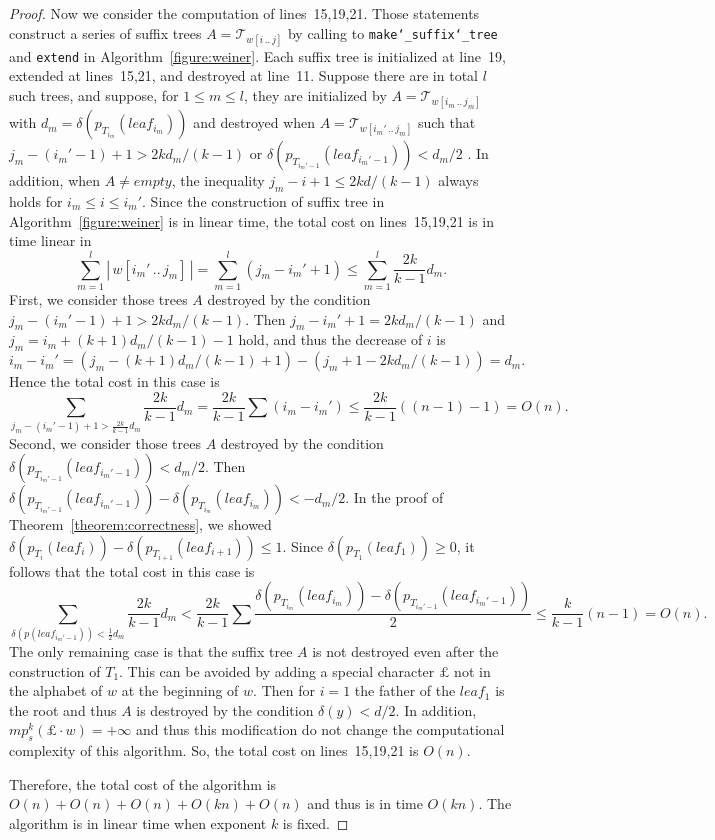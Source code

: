 \documentclass{article}
\def\us{\char`\_}
\def\subw#1#2#3{{#1[#2\,..\,#3]}}
\def\abs#1{{|\,#1\,|}}
\def\tree{\mathcal{T}}
\begin{document}
\begin{proof}
Now we consider the computation of lines~15,19,21. Those statements
construct a series of suffix trees $A=\tree_{\subw{w}{i}{j}}$ by
calling to {\tt make\us suffix\us tree} and {\tt extend} in
Algorithm~\ref{figure:weiner}. Each suffix tree is initialized at
line~19, extended at lines~15,21, and destroyed at line~11. Suppose
there are in total $l$ such trees, and suppose, for $1\leq m\leq l$,
they are initialized by $A=\tree_{\subw{w}{i_m}{j_m}}$ with
$d_m=\delta(p_{T_{i_m}}(leaf_{i_m}))$ and destroyed when
$A=\tree_{\subw{w}{i_m'}{j_m}}$ such that
$j_m-(i_m'-1)+1>2kd_m/(k-1)$ or
$\delta(p_{T_{i_m'-1}}(leaf_{i_m'-1}))<d_m/2$ . In addition, when
$A\neq empty$, the inequality $j_m-i+1\leq2kd/(k-1)$ always holds
for $i_m\leq i\leq i_m'$. Since the construction of suffix tree in
Algorithm~\ref{figure:weiner} is in linear time, the total cost on
lines~15,19,21 is in time linear in
  \[\sum_{m=1}^l\abs{\subw{w}{i_m'}{j_m}}
  =\sum_{m=1}^l(j_m-i_m'+1)
  \leq\sum_{m=1}^l\frac{2k}{k-1}d_m.\]
First, we consider those trees $A$ destroyed by the condition
$j_m-(i_m'-1)+1>2kd_m/(k-1)$. Then $j_m-i_m'+1=2kd_m/(k-1)$ and
$j_m=i_m+(k+1)d_m/(k-1)-1$ hold, and thus the decrease of $i$ is
$i_m-i_m'=\left(j_m-(k+1)d_m/(k-1)+1\right)-\left(j_m+1-2kd_m/(k-1)\right)=d_m.$
Hence the total cost in this case is
  \[\sum_{j_m-(i_m'-1)+1>\frac{2k}{k-1}d_m}\frac{2k}{k-1}d_m
  =\frac{2k}{k-1}\sum(i_m-i_m')
  \leq\frac{2k}{k-1}\left((n-1)-1\right)
  =O(n).\]
Second, we consider those trees $A$ destroyed by the condition
$\delta(p_{T_{i_m'-1}}(leaf_{i_m'-1}))<d_m/2$. Then
$\delta(p_{T_{i_m'-1}}(leaf_{i_m'-1}))-\delta(p_{T_{i_m}}(leaf_{i_m}))<-d_m/2$.
In the proof of Theorem~\ref{theorem:correctness}, we showed
$\delta(p_{T_{i}}(leaf_{i}))-\delta(p_{T_{i+1}}(leaf_{i+1}))\leq1$.
Since $\delta(p_{T_1}(leaf_1))\geq0$, it follows that the total cost
in this case is
  \[\sum_{\delta(p(leaf_{i_m'-1}))<\frac{1}{2}d_m}\frac{2k}{k-1}d_m
  <\frac{2k}{k-1}\sum\frac{\delta(p_{T_{i_m}}(leaf_{i_m}))-\delta(p_{T_{i_m'-1}}(leaf_{i_m'-1}))}{2}
  \leq\frac{k}{k-1}(n-1)
  =O(n).\]
The only remaining case is that the suffix tree $A$ is not destroyed
even after the construction of $T_1$. This can be avoided by adding
a special character $\pounds$ not in the alphabet of $w$ at the
beginning of $w$. Then for $i=1$ the father of the $leaf_1$ is the
root and thus $A$ is destroyed by the condition $\delta(y)<d/2$. In
addition, $mp_s^k(\pounds\cdot w)=+\infty$ and thus this
modification do not change the computational complexity of this
algorithm. So, the total cost on lines~15,19,21 is $O(n)$.

Therefore, the total cost of the algorithm is
$O(n)+O(n)+O(n)+O(kn)+O(n)$ and thus is in time $O(kn)$. The
algorithm is in linear time when exponent $k$ is fixed.
\end{proof}
\end{document}
